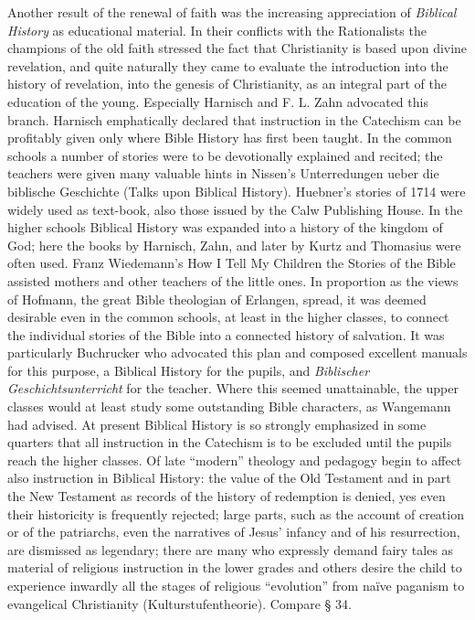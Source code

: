 Another result of the renewal of faith was the increasing appreciation of \emph{Biblical History} as educational material. In their conflicts with the Rationalists the champions of the old faith stressed the fact that Christianity is based upon divine revelation, and quite naturally they came to evaluate the introduction into the history of revelation, into the genesis of Christianity, as an integral part of the education of the young. Especially Harnisch and F. L. Zahn advocated this branch. Harnisch emphatically declared that instruction in the Catechism can be profitably given only where Bible History has first been taught. In the common schools a number of stories were to be devotionally explained and recited; the teachers were given many valuable hints in Nissen’s Unterredungen ueber die biblische Geschichte (Talks upon Biblical History). Huebner’s stories of 1714 were widely used as text-book, also those issued by the Calw Publishing House. In the higher schools Biblical History was expanded into a history of the kingdom of God; here the books by Harnisch,
Zahn, and later by Kurtz and Thomasius were often used. Franz Wiedemann’s How I Tell My Children the Stories of the Bible assisted mothers and other teachers of the little ones. In proportion as the views of Hofmann, the great Bible theologian of Erlangen, spread, it was deemed desirable even in the common schools, at least in the higher classes, to connect the individual stories of the Bible into a connected history of salvation. It was particularly Buchrucker who advocated this plan and composed excellent manuals for this purpose, a Biblical History for the pupils, and \emph{Biblischer Geschichtsunterricht} for the teacher. Where this seemed unattainable, the upper classes would at least study some outstanding Bible characters, as Wangemann had advised. At present Biblical History is so strongly emphasized in some quarters that all instruction in the Catechism is to be excluded until the pupils reach the higher classes. Of late “modern” theology and pedagogy begin to affect also instruction in Biblical History: the value of the Old Testament and in part the New Testament as records of the history of redemption is denied, yes even their historicity is frequently rejected; large parts, such as the account of creation or of the patriarchs, even the narratives of Jesus’ infancy and of his resurrection, are dismissed as legendary; there are many who expressly demand fairy tales as material of religious instruction in the lower grades and others desire the child to experience inwardly all the stages of religious “evolution” from naïve paganism to evangelical Christianity (Kulturstufentheorie). Compare § 34.

